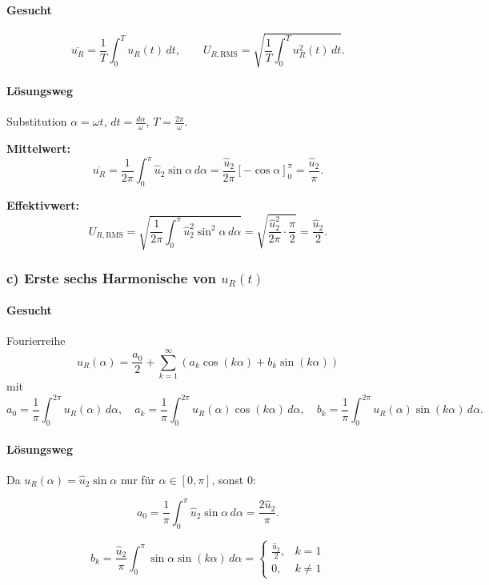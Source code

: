 \paragraph{Gesucht}
\[
\overline{u_R}=\frac{1}{T}\int_0^T u_R(t)\,dt,
\qquad
U_{R,\mathrm{RMS}}=\sqrt{\frac{1}{T}\int_0^T u_R^2(t)\,dt}.
\]

\paragraph{Lösungsweg}
Substitution $\alpha=\omega t$, $dt=\frac{d\alpha}{\omega}$, $T=\frac{2\pi}{\omega}$.

\textbf{Mittelwert:}
\[
\overline{u_R}
=\frac{1}{2\pi}\int_0^{\pi}\hat u_2\sin\alpha\,d\alpha
=\frac{\hat u_2}{2\pi}\left[-\cos\alpha\right]_0^\pi
=\boxed{\frac{\hat u_2}{\pi}}.
\]

\textbf{Effektivwert:}
\[
U_{R,\mathrm{RMS}}
=\sqrt{\frac{1}{2\pi}\int_0^{\pi}\hat u_2^2\sin^2\alpha\,d\alpha}
=
\sqrt{\frac{\hat u_2^2}{2\pi}\cdot\frac{\pi}{2}}
=
\boxed{\frac{\hat u_2}{2}}.
\]

\subsubsection*{c) Erste sechs Harmonische von $u_R(t)$}

\paragraph{Gesucht}
Fourierreihe
\[
u_R(\alpha)=\frac{a_0}{2}+\sum_{k=1}^{\infty}\left(a_k\cos(k\alpha)+b_k\sin(k\alpha)\right)
\]
mit
\[
a_0=\frac{1}{\pi}\int_0^{2\pi}u_R(\alpha)\,d\alpha,\quad
a_k=\frac{1}{\pi}\int_0^{2\pi}u_R(\alpha)\cos(k\alpha)\,d\alpha,\quad
b_k=\frac{1}{\pi}\int_0^{2\pi}u_R(\alpha)\sin(k\alpha)\,d\alpha.
\]

\paragraph{Lösungsweg}
Da $u_R(\alpha)=\hat u_2\sin\alpha$ nur für $\alpha\in[0,\pi]$, sonst 0:

\[
a_0=\frac{1}{\pi}\int_0^{\pi}\hat u_2\sin\alpha\,d\alpha
=\boxed{\frac{2\hat u_2}{\pi}}.
\]

\[
b_k=\frac{\hat u_2}{\pi}\int_0^{\pi}\sin\alpha\sin(k\alpha)\,d\alpha
=
\begin{cases}
\frac{\hat u_2}{2}, & k=1\\
0, & k\neq 1
\end{cases}
\]

